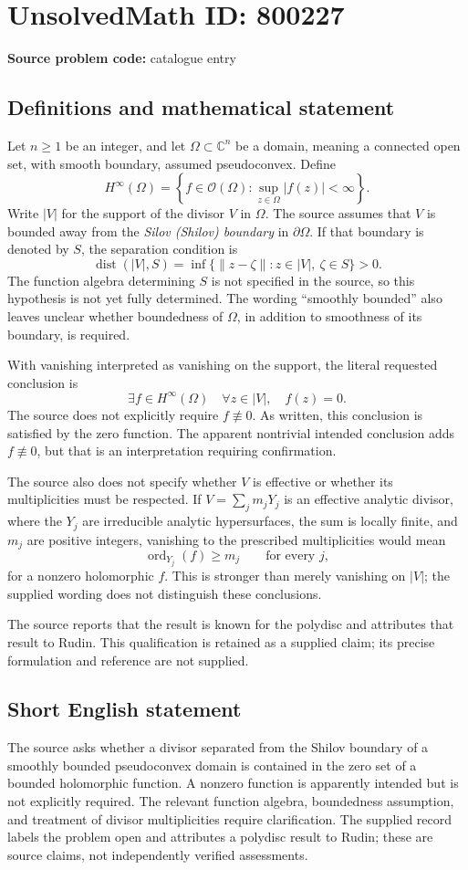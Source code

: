 \documentclass[11pt]{article}
\newcommand{\C}{\mathbb{C}}
\begin{document}
\section*{UnsolvedMath ID: 800227}
\textbf{Source problem code:} catalogue entry
\subsection{Definitions and mathematical statement}
Let \(n\geq 1\) be an integer, and let \(\Omega\subset\C^n\) be a domain, meaning a connected open set, with smooth boundary, assumed pseudoconvex. Define
\[
H^\infty(\Omega)=\left\{f\in\mathcal O(\Omega):\sup_{z\in\Omega}|f(z)|<\infty\right\}.
\]
Write \(|V|\) for the support of the divisor \(V\) in \(\Omega\). The source assumes that \(V\) is bounded away from the \emph{Silov (Shilov) boundary} in \(\partial\Omega\). If that boundary is denoted by \(S\), the separation condition is
\[
\operatorname{dist}(|V|,S)
=\inf\{\|z-\zeta\|:z\in|V|,\ \zeta\in S\}>0.
\]
The function algebra determining \(S\) is not specified in the source, so this hypothesis is not yet fully determined. The wording ``smoothly bounded'' also leaves unclear whether boundedness of \(\Omega\), in addition to smoothness of its boundary, is required.

With vanishing interpreted as vanishing on the support, the literal requested conclusion is
\[
\exists f\in H^\infty(\Omega)\quad
\forall z\in|V|,\quad f(z)=0.
\]
The source does not explicitly require \(f\not\equiv0\). As written, this conclusion is satisfied by the zero function. The apparent nontrivial intended conclusion adds \(f\not\equiv0\), but that is an interpretation requiring confirmation.

The source also does not specify whether \(V\) is effective or whether its multiplicities must be respected. If \(V=\sum_j m_jY_j\) is an effective analytic divisor, where the \(Y_j\) are irreducible analytic hypersurfaces, the sum is locally finite, and \(m_j\) are positive integers, vanishing to the prescribed multiplicities would mean
\[
\operatorname{ord}_{Y_j}(f)\geq m_j\qquad\text{for every }j,
\]
for a nonzero holomorphic \(f\). This is stronger than merely vanishing on \(|V|\); the supplied wording does not distinguish these conclusions.

The source reports that the result is known for the polydisc and attributes that result to Rudin. This qualification is retained as a supplied claim; its precise formulation and reference are not supplied.
\subsection{Short English statement}
The source asks whether a divisor separated from the Shilov boundary of a smoothly bounded pseudoconvex domain is contained in the zero set of a bounded holomorphic function. A nonzero function is apparently intended but is not explicitly required. The relevant function algebra, boundedness assumption, and treatment of divisor multiplicities require clarification. The supplied record labels the problem open and attributes a polydisc result to Rudin; these are source claims, not independently verified assessments.
\end{document}
